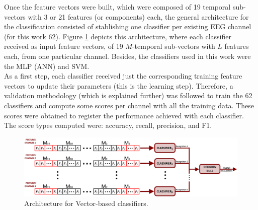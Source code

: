 Once the feature vectors were built, which were composed of 19 temporal sub-vectors with 3 or 21 features (or components) each, the general architecture for the classification consisted of stablishing one classifier per existing EEG channel (for this work 62). Figure \ref{Fig: Classification_VB} depicts this architecture, where each classifier received as input feature vectors, of 19 $M$-temporal sub-vectors with $L$ features each, from one particular channel. Besides, the classifiers used in this work were the MLP (ANN) and SVM.\\

As a first step, each classifier received just the corresponding training feature vectors to update their parameters (this is the learning step). Therefore,  a validation methodology (which is explained further) was followed to train the 62 classifiers and compute some scores per channel with all the training data. These scores were obtained to register the performance achieved with each classifier. The score types computed were: accuracy, recall, precision, and F1.\\

\begin{figure}[h!]
	\centering
	\includegraphics[width=\linewidth]{Figures/Classification_VB.png}
	\caption{Architecture for Vector-based classifiers.}
	\label{Fig: Classification_VB}
\end{figure}

